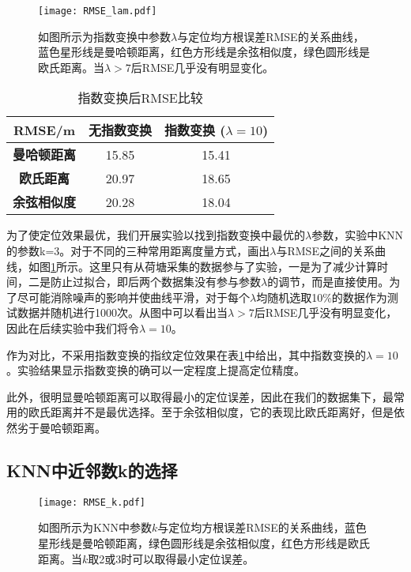 \begin{figure}
\centering
\texttt{[image: RMSE\_lam.pdf]}
\caption{如图所示为指数变换中参数$\lambda$与定位均方根误差RMSE的关系曲线，蓝色星形线是曼哈顿距离，红色方形线是余弦相似度，绿色圆形线是欧氏距离。当$\lambda>7$后RMSE几乎没有明显变化。}
\label{fig:rmse_lam}
\end{figure}

\begin{table}[tbp]
	\caption{指数变换后RMSE比较}
	\begin{center}
		\begin{tabular}{ccc}
			\toprule
			\textbf{RMSE/m} & \textbf{无指数变换} & \textbf{指数变换 ($\lambda=10$)} \\
			\midrule
			\textbf{曼哈顿距离} & 15.85 & 15.41 \\
			\midrule
			\textbf{欧氏距离} & 20.97 & 18.65 \\
			\midrule
			\textbf{余弦相似度} & 20.28 & 18.04 \\
			\bottomrule
		\end{tabular}
		\label{tab:no_exp}
	\end{center}
\end{table}

为了使定位效果最优，我们开展实验以找到指数变换中最优的$\lambda$参数，实验中KNN的参数k=3。对于不同的三种常用距离度量方式，画出$\lambda$与RMSE之间的关系曲线，如图\ref{fig:rmse_lam}所示。这里只有从荷塘采集的数据参与了实验，一是为了减少计算时间，二是防止过拟合，即后两个数据集没有参与参数$\lambda$的调节，而是直接使用。为了尽可能消除噪声的影响并使曲线平滑，对于每个$\lambda$均随机选取10\%的数据作为测试数据并随机进行1000次。从图中可以看出当$\lambda>7$后RMSE几乎没有明显变化，因此在后续实验中我们将令$\lambda=10$。

作为对比，不采用指数变换的指纹定位效果在表\ref{tab:no_exp}中给出，其中指数变换的$\lambda=10$。实验结果显示指数变换的确可以一定程度上提高定位精度。

此外，很明显曼哈顿距离可以取得最小的定位误差，因此在我们的数据集下，最常用的欧氏距离并不是最优选择。至于余弦相似度，它的表现比欧氏距离好，但是依然劣于曼哈顿距离。

\subsection{KNN中近邻数k的选择}

\begin{figure}
	\centering
	\texttt{[image: RMSE\_k.pdf]}
	\caption{如图所示为KNN中参数$k$与定位均方根误差RMSE的关系曲线，蓝色星形线是曼哈顿距离，绿色圆形线是余弦相似度，红色方形线是欧氏距离。当$k$取2或3时可以取得最小定位误差。}
	\label{fig:rmse_k}
\end{figure}

